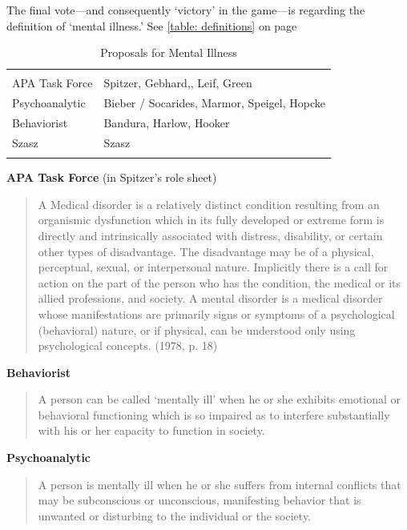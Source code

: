 The final vote---and consequently `victory' in the game---is regarding the definition of `mental illness.' See \ref{table: definitions} on page \pageref{table: definitions}

 \begin{longtable}[!t]{ | P{3cm} | P{5cm} | }
\hline
{}&
\\
APA Task Force&
Spitzer, Gebhard,, Leif, Green\\
Psychoanalytic&
Bieber / Socarides, Marmor, Speigel, Hopcke\\
Behaviorist&
Bandura, Harlow, Hooker\\
Szasz&
Szasz\\ \hline
\caption{Proposals for Mental Illness}
\label{table: mentalillness}
\end{longtable}

\textbf{APA Task Force} (in Spitzer's role sheet)

\begin{quote}

A Medical disorder is a relatively distinct condition resulting from an organismic dysfunction which in its fully developed or extreme form is directly and intrinsically associated with distress, disability, or certain other types of disadvantage. The disadvantage may be of a physical, perceptual, sexual, or interpersonal nature. Implicitly there is a call for action on the part of the person who has the condition, the medical or its allied professions, and society.
A mental disorder is a medical disorder whose manifestations are primarily signs or symptoms of a psychological (behavioral) nature, or if physical, can be understood only using psychological concepts. (1978, p. 18)
\end{quote}

\textbf{Behaviorist}

\begin{quote}

A person can be called `mentally ill' when he or she exhibits emotional or behavioral functioning which is so impaired as to interfere substantially with his or her capacity to function in society. 
\end{quote}

\textbf{Psychoanalytic} 

\begin{quote}

A person is mentally ill when he or she suffers from internal conflicts that may be subconscious or unconscious, manifesting behavior that is unwanted or disturbing to the individual or the society.
\end{quote}

